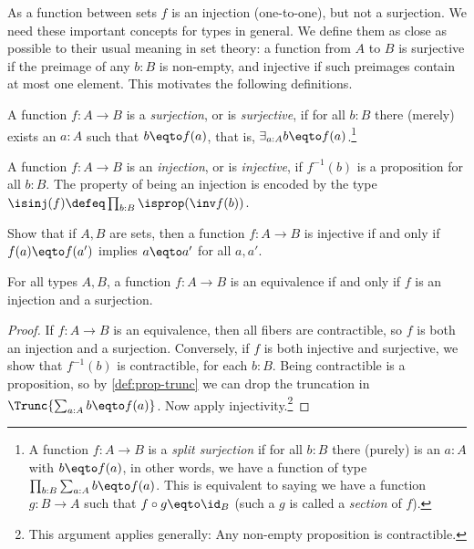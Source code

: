 As a function between sets
$f$ is an injection (one-to-one), but not a surjection.
We need these important concepts for types in general.
We define them as close as possible to their
usual meaning in set theory: a function from $A$ to $B$ is
surjective if the preimage of any $b:B$ is non-empty,
and injective if such preimages contain at most one element.
This motivates the following definitions.

\begin{definition}\label{def:surjection}
A function $f:A\to B$ is a \emph{surjection}, or is \emph{surjective},
if for all $b:B$ there (merely) exists an $a:A$ such that $b \eqto f(a)$,
that is, $\exists_{a:A} b \eqto f(a)$.\footnote{%
  A function $f:A\to B$ is a \emph{split surjection}
  if for all $b:B$ there (purely) is an $a:A$ with $b \eqto f(a)$,
  in other words, we have a function of type $\prod_{b:B} \sum_{a:A} b \eqto f(a)$.
  This is equivalent to saying we have a function
  $g:B\to A$ such that $f\circ g \eqto \id_B$
  (such a $g$ is called a \emph{section} of $f$).}
\end{definition}

\begin{definition}\label{def:injection}
  A function $f:A\to B$ is an \emph{injection}, or is \emph{injective},
  if $f^{-1}(b)$ is a proposition for all $b:B$.  The property of being an injection is encoded by
  the type $\isinj(f) \defeq \prod_{b:B} \isprop(\inv f (b))$.
\end{definition}

\begin{xca}\label{xca:inj-sets}
  Show that if $A,B$ are sets, then a function
  $f : A \to B$ is injective if and only if
  $f(a) \eqto f(a')$ implies $a \eqto a'$ for all $a,a'$.
\end{xca}

\begin{lemma}\label{lem:inj+surj}
For all types $A,B$, a function $f: A\to B$ is an equivalence
if and only if $f$ is an injection and a surjection.
\end{lemma}

\begin{proof}
If $f: A\to B$ is an equivalence, then all fibers are contractible,
so $f$ is both an injection and a surjection. Conversely,
if $f$ is both injective and surjective, we show that
$f^{-1}(b)$ is contractible, for each $b:B$.
Being contractible is a proposition, so by \cref{def:prop-trunc}
we can drop the truncation in $\Trunc{\sum_{a:A} b \eqto f(a)}$.
Now apply injectivity.\footnote{%
  This argument applies generally:
  Any non-empty proposition is contractible.}
\end{proof}

